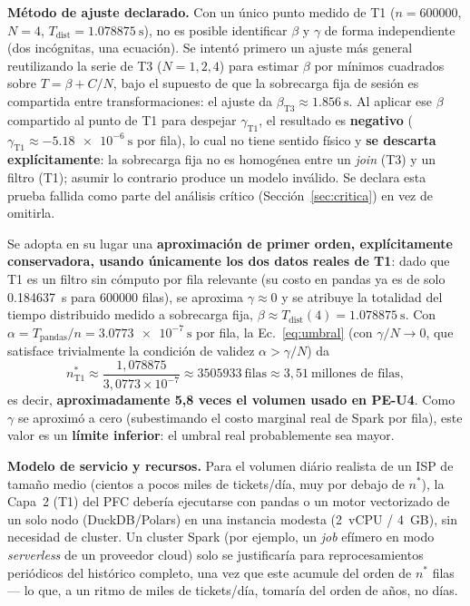 \documentclass[11pt,a4paper]{article}
\begin{document}
\textbf{M\'etodo de ajuste declarado.} Con un \'unico punto medido de T1
($n=\num{600000}$, $N=4$, $T_{\text{dist}}=\SI{1.078875}{\second}$), no es posible identificar
$\beta$ y $\gamma$ de forma independiente (dos inc\'ognitas, una ecuaci\'on). Se intent\'o
primero un ajuste m\'as general reutilizando la serie de T3 ($N=1,2,4$) para estimar
$\beta$ por m\'inimos cuadrados sobre $T=\beta+C/N$, bajo el supuesto de que la sobrecarga
fija de sesi\'on es compartida entre transformaciones: el ajuste da $\beta_{\text{T3}}\approx\SI{1.856}{\second}$.
Al aplicar ese $\beta$ compartido al punto de T1 para despejar $\gamma_{\text{T1}}$, el
resultado es \textbf{negativo} ($\gamma_{\text{T1}}\approx\SI{-5.18e-6}{\second}$ por fila),
lo cual no tiene sentido f\'isico y \textbf{se descarta expl\'icitamente}: la sobrecarga fija
no es homog\'enea entre un \textit{join} (T3) y un filtro (T1); asumir lo contrario produce un
modelo inv\'alido. Se declara esta prueba fallida como parte del an\'alisis cr\'itico
(Secci\'on~\ref{sec:critica}) en vez de omitirla.

Se adopta en su lugar una \textbf{aproximaci\'on de primer orden, expl\'icitamente
conservadora, usando \'unicamente los dos datos reales de T1}: dado que T1 es un filtro sin
c\'omputo por fila relevante (su costo en pandas ya es de solo \SI{0.184637}{\second} para
\num{600000} filas), se aproxima $\gamma\approx 0$ y se atribuye la totalidad del tiempo
distribuido medido a sobrecarga fija, $\beta\approx T_{\text{dist}}(4)=\SI{1.078875}{\second}$.
Con $\alpha = T_{\text{pandas}}/n = \SI{3.0773e-7}{\second}$ por fila, la Ec.~\eqref{eq:umbral}
(con $\gamma/N\to 0$, que satisface trivialmente la condici\'on de validez $\alpha>\gamma/N$) da
\[
n^{*}_{\text{T1}} \approx \frac{1{,}078875}{3{,}0773\times10^{-7}} \approx \num{3505933}\ \text{filas} \approx 3{,}51\ \text{millones de filas},
\]
es decir, \textbf{aproximadamente 5,8 veces el volumen usado en PE-U4}. Como $\gamma$ se
aproxim\'o a cero (subestimando el costo marginal real de Spark por fila), este valor es un
\textbf{l\'imite inferior}: el umbral real probablemente sea mayor.

\textbf{Modelo de servicio y recursos.} Para el volumen di\'ario realista de un ISP de tama\~no
medio (cientos a pocos miles de tickets/d\'ia, muy por debajo de $n^{*}$), la Capa~2 (T1) del
PFC deber\'ia ejecutarse con pandas o un motor vectorizado de un solo nodo (DuckDB/Polars) en
una instancia modesta (2~vCPU / 4~GB), sin necesidad de cluster. Un cluster Spark
(por ejemplo, un \textit{job} ef\'imero en modo \textit{serverless} de un proveedor cloud) solo
se justificar\'ia para reprocesamientos peri\'odicos del hist\'orico completo, una vez que este
acumule del orden de $n^{*}$ filas --- lo que, a un ritmo de miles de tickets/d\'ia, tomar\'ia
del orden de a\~nos, no d\'ias.
\end{document}
